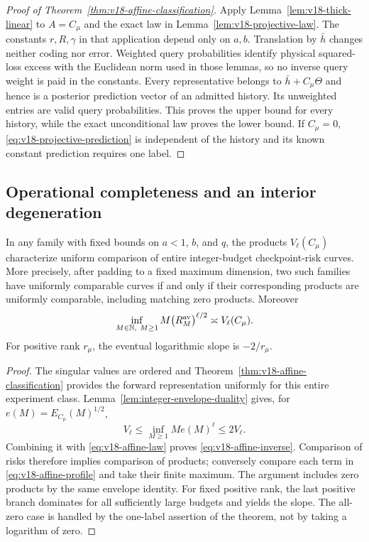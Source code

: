 \begin{proof}[Proof of Theorem~\ref{thm:v18-affine-classification}]
Apply Lemma~\ref{lem:v18-thick-linear} to $A=C_\mu$ and the exact law
in Lemma~\ref{lem:v18-projective-law}. The constants $r,R,\gamma$ in
that application depend only on $a,b$. Translation by $\bar h$ changes
neither coding nor error. Weighted query probabilities identify physical
squared-loss excess with the Euclidean norm used in those lemmas, so no
inverse query weight is paid in the constants. Every representative
belongs to $\bar h+C_\mu\Theta$ and hence is a posterior prediction
vector of an admitted history. Its unweighted entries are valid query
probabilities. This proves the upper bound for every history, while
the exact unconditional law proves the lower bound. If $C_\mu=0$,
\eqref{eq:v18-projective-prediction} is independent of the history and
its known constant prediction requires one label.
\end{proof}

\subsection{Operational completeness and an interior degeneration}
\begin{corollary}
\label{cor:v18-affine-invariant}
In any family with fixed bounds on $a<1$, $b$, and $q$, the products
$V_\ell(C_\mu)$ characterize uniform comparison of entire integer-budget
checkpoint-risk curves. More precisely, after padding to a fixed maximum
dimension, two such families have uniformly comparable curves if and
only if their corresponding products are uniformly comparable,
including matching zero products. Moreover
\begin{equation}\label{eq:v18-affine-inverse}
 \inf_{M\in\mathbb N,\ M\ge1}M\bigl(R^{\mathrm{av}}_M\bigr)^{\ell/2}
 \asymp V_\ell(C_\mu).
\end{equation}
For positive rank $r_\mu$, the eventual logarithmic slope is $-2/r_\mu$.
\end{corollary}
\begin{proof}
The singular values are ordered and Theorem~\ref{thm:v18-affine-classification}
provides the forward representation uniformly for this entire experiment
class. Lemma~\ref{lem:integer-envelope-duality} gives, for
$e(M)=E_{C_\mu}(M)^{1/2}$,
\[
 V_\ell\le\inf_{M\ge1}Me(M)^\ell\le2V_\ell.
\]
Combining it with \eqref{eq:v18-affine-law} proves
\eqref{eq:v18-affine-inverse}. Comparison of risks therefore implies
comparison of products; conversely compare each term in
\eqref{eq:v18-affine-profile} and take their finite maximum.
The argument includes zero products by the same envelope identity.
For fixed positive rank, the last positive branch dominates for all
sufficiently large budgets and yields the slope. The all-zero case is
handled by the one-label assertion of the theorem, not by taking a
logarithm of zero.
\end{proof}


